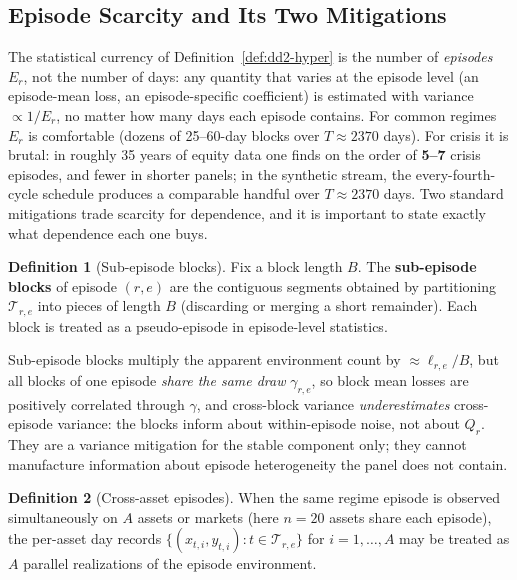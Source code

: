 \documentclass[11pt,a4paper]{article}
\theoremstyle{definition}
\newtheorem{definition}{Definition}[section]
\theoremstyle{plain}
\begin{document}
\subsection{Episode Scarcity and Its Two Mitigations}
\label{sec:dd2-scarcity}

The statistical currency of Definition~\ref{def:dd2-hyper} is the number of
\emph{episodes} $E_r$, not the number of days: any quantity that varies at the
episode level (an episode-mean loss, an episode-specific coefficient) is
estimated with variance $\propto 1/E_r$, no matter how many days each episode
contains. For common regimes $E_r$ is comfortable (dozens of 25--60-day
blocks over $T \approx 2370$ days). For \textsf{crisis} it is brutal: in
roughly 35 years of equity data one finds on the order of \textbf{5--7}
crisis episodes, and fewer in shorter panels; in the synthetic stream, the
every-fourth-cycle schedule produces a comparable handful over
$T \approx 2370$ days. Two standard mitigations trade scarcity for
dependence, and it is important to state exactly what dependence each one
buys.

\begin{definition}[Sub-episode blocks]
\label{def:dd2-subepisode}
Fix a block length $B$. The \textbf{sub-episode blocks} of episode $(r,e)$
are the contiguous segments obtained by partitioning $\mathcal{T}_{r,e}$ into
pieces of length $B$ (discarding or merging a short remainder). Each block is
treated as a pseudo-episode in episode-level statistics.
\end{definition}

Sub-episode blocks multiply the apparent environment count by
$\approx \ell_{r,e}/B$, but all blocks of one episode \emph{share the same
draw} $\gamma_{r,e}$, so block mean losses are positively correlated through
$\gamma$, and cross-block variance \emph{underestimates} cross-episode
variance: the blocks inform about within-episode noise, not about $Q_r$.
They are a variance mitigation for the stable component only; they cannot
manufacture information about episode heterogeneity the panel does not
contain.

\begin{definition}[Cross-asset episodes]
\label{def:dd2-crossasset}
When the same regime episode is observed simultaneously on $A$ assets or
markets (here $n = 20$ assets share each episode), the per-asset day records
$\{(x_{t,i}, y_{t,i}) : t \in \mathcal{T}_{r,e}\}$ for $i = 1, \ldots, A$ may
be treated as $A$ parallel realizations of the episode environment.
\end{definition}
\end{document}
